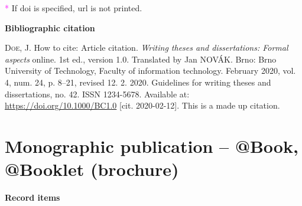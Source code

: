 \bigskip
\textcolor{magenta}{*} If doi is specified, url is not printed.
\bigskip

\bigskip

\noindent \textbf{Bibliographic citation}

\medskip

\noindent \textsc{Doe}, J. How to cite: Article citation. \textit{Writing theses and dissertations: Formal aspects} online. 1st ed., version 1.0. Translated by Jan NOVÁK. Brno: Brno University of Technology, Faculty of information technology. February 2020, vol. 4, num. 24, p. 8–21, revised 12. 2. 2020. Guidelines for writing theses and dissertations, no. 42. ISSN 1234-5678. Available at: \url{https://doi.org/10.1000/BC1.0} [cit. 2020-02-12]. This is a made up citation.

\newpage
\section*{Monographic publication -- @Book, @Booklet (brochure)}
\label{pr-monografie}
\noindent \textbf{Record items}

\medskip

